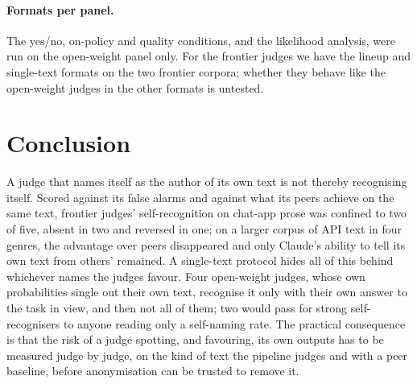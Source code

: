 \paragraph{Formats per panel.} The yes/no, on-policy and quality
conditions, and the likelihood analysis, were run on the open-weight panel
only. For the frontier judges we have the lineup and single-text formats on
the two frontier corpora; whether they behave like the open-weight judges in
the other formats is untested.

\section{Conclusion}
\label{sec:conclusion}

A judge that names itself as the author of its own text is not thereby
recognising itself. Scored against its false alarms and against what its
peers achieve on the same text, frontier judges' self-recognition on
chat-app prose was confined to two of five, absent in two and reversed in
one; on a larger corpus of API text in four genres, the advantage over peers
disappeared and only Claude's ability to tell its own text from others'
remained. A single-text protocol hides all of this behind whichever names
the judges favour. Four open-weight judges, whose own probabilities single
out their own text, recognise it only with their own answer to the task in
view, and then not all of them; two would pass for strong self-recognisers to
anyone reading only a self-naming rate. The practical consequence is that
the risk of a judge spotting, and favouring, its own outputs has to be
measured judge by judge, on the kind of text the pipeline judges and with a
peer baseline, before anonymisation can be trusted to remove it.
